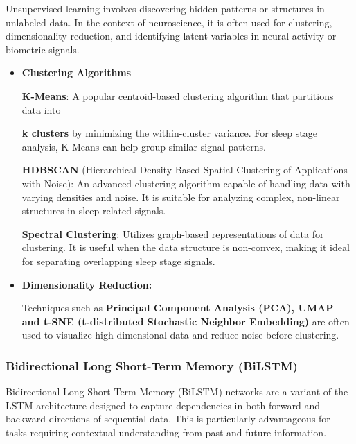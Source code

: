 \documentclass[a4paper,12pt,twoside]{article}
\begin{document}
    Unsupervised learning involves discovering hidden patterns or structures in unlabeled data. In the context of neuroscience, it is often used for clustering, dimensionality reduction, and identifying latent variables in neural activity or biometric signals.
    \begin{itemize}
        \item \textbf{Clustering Algorithms}
        
            \textbf{K-Means}: A popular centroid-based clustering algorithm that partitions data into 
            
            \textbf{k clusters} by minimizing the within-cluster variance. For sleep stage analysis, K-Means can help group similar signal patterns.
            
            \textbf{HDBSCAN }(Hierarchical Density-Based Spatial Clustering of Applications with Noise): An advanced clustering algorithm capable of handling data with varying densities and noise. It is suitable for analyzing complex, non-linear structures in sleep-related signals.
            
            \textbf{Spectral Clustering}: Utilizes graph-based representations of data for clustering. It is useful when the data structure is non-convex, making it ideal for separating overlapping sleep stage signals.
        \item \textbf{Dimensionality Reduction:}

            Techniques such as \textbf{Principal Component Analysis (PCA), UMAP and t-SNE (t-distributed Stochastic Neighbor Embedding)} are often used to visualize high-dimensional data and reduce noise before clustering.

    \end{itemize}

\subsubsection{Bidirectional Long Short-Term Memory (BiLSTM)}

Bidirectional Long Short-Term Memory (BiLSTM) networks are a variant of the LSTM architecture designed to capture dependencies in both forward and backward directions of sequential data. This is particularly advantageous for tasks requiring contextual understanding from past and future information.
\end{document}
